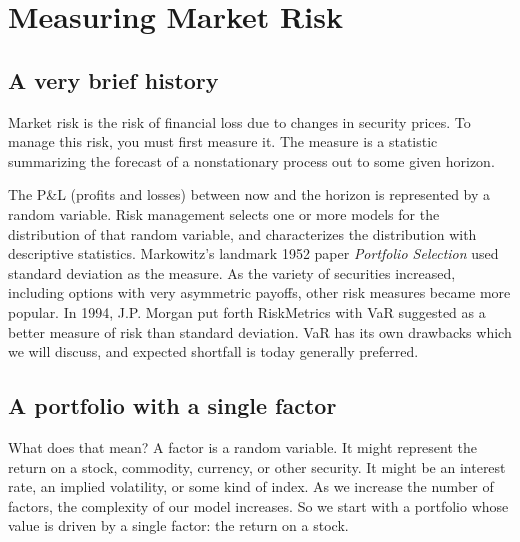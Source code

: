 \documentclass{report}
\numberwithin{problem}{chapter} %
\newcommand{\pnl}{P\&L }
\begin{document}
\chapter{Measuring Market Risk}

\section{A very brief history}
Market risk is the risk of financial loss due to changes in security prices. To manage this risk, you must first measure it. The measure is a statistic summarizing the forecast of a \gls{nonstationary} process out to some given horizon. 

The \pnl (profits and losses) between now and the horizon is represented by a random variable. Risk management selects one or more models for the distribution of that random variable, and characterizes the distribution with descriptive statistics. Markowitz's landmark 1952 paper {\it Portfolio Selection} used standard deviation as the measure. As the variety of securities increased, including options with very asymmetric payoffs, other risk measures became more popular. In 1994, J.P. Morgan put forth RiskMetrics with VaR suggested as a better measure of risk than standard deviation. VaR has its own drawbacks which we will discuss, and expected shortfall is today generally preferred.  

\section{A portfolio with a single factor}
What does that mean? A factor is a random variable. It might represent the return on a stock, commodity, currency, or other security. It might be an interest rate, an implied volatility, or some kind of index. As we increase the number of factors, the complexity of our model increases. So we start with a portfolio whose value is driven by a single factor: the return on a stock.
\end{document}
